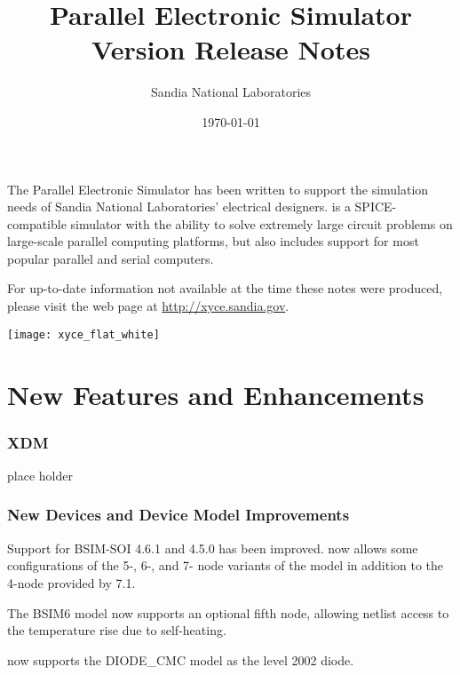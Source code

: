 \documentclass[letterpaper]{scrartcl}
\title{\XyceTitle{} Parallel Electronic Simulator\\
Version \XyceVersionVar{} Release Notes}
\author{ Sandia National Laboratories}
\date{\today}
\begin{document}
\maketitle

The \XyceTM{} Parallel Electronic Simulator has been written to support the
simulation needs of Sandia National Laboratories' electrical designers.
\XyceTM{} is a SPICE-compatible simulator with the ability to solve extremely
large circuit problems on large-scale parallel computing platforms, but also
includes support for most popular parallel and serial computers.

For up-to-date information not available at the time these notes were produced,
please visit the \XyceTM{} web page at
{\color{XyceDeepRed}\url{http://xyce.sandia.gov}}.


\tableofcontents
\vspace*{\fill}
\parbox{\textwidth}
{
  \hfill
  \texttt{[image: xyce\_flat\_white]}
}


\newpage
\section{New Features and Enhancements}

\subsubsection*{XDM}
\begin{XyceItemize}
  \item place holder
\end{XyceItemize}

\subsubsection*{New Devices and Device Model Improvements}
\begin{XyceItemize}
  \item Support for BSIM-SOI 4.6.1 and 4.5.0 has been improved.  \Xyce{}
    now allows some configurations of the 5-, 6-, and 7- node variants
    of the model in addition to the 4-node provided by \Xyce{} 7.1.
  \item The BSIM6 model now supports an optional fifth node, allowing
    netlist access to the temperature rise due to self-heating.
  \item \Xyce{} now supports the DIODE\_CMC model as the level 2002 diode.
\end{XyceItemize}
\end{document}
